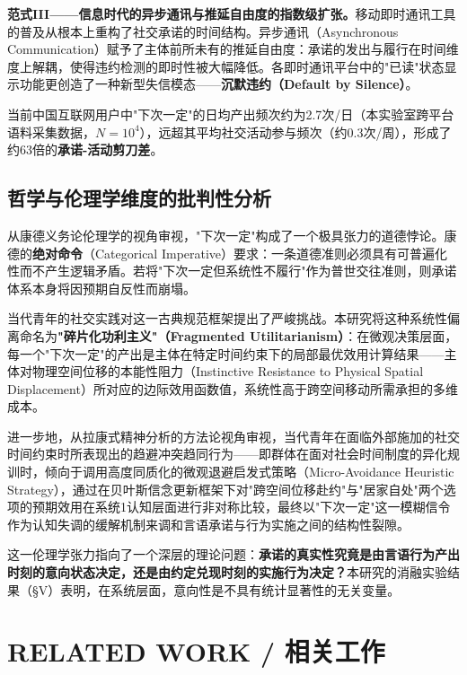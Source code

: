 \documentclass[journal]{IEEEtran}
\begin{document}
\textbf{范式III——信息时代的异步通讯与推延自由度的指数级扩张。}移动即时通讯工具的普及从根本上重构了社交承诺的时间结构。异步通讯（Asynchronous Communication）赋予了主体前所未有的推延自由度：承诺的发出与履行在时间维度上解耦，使得违约检测的即时性被大幅降低。各即时通讯平台中的"已读"状态显示功能更创造了一种新型失信模态——\textbf{沉默违约（Default by Silence）}。

当前中国互联网用户中"下次一定"的日均产出频次约为2.7次/日（本实验室跨平台语料采集数据，$N=10^4$），远超其平均社交活动参与频次（约0.3次/周），形成了约63倍的\textbf{承诺-活动剪刀差}。

\subsection{哲学与伦理学维度的批判性分析}

从康德义务论伦理学的视角审视，"下次一定"构成了一个极具张力的道德悖论。康德的\textbf{绝对命令}（Categorical Imperative）要求：一条道德准则必须具有可普遍化性而不产生逻辑矛盾。若将"下次一定但系统性不履行"作为普世交往准则，则承诺体系本身将因预期自反性而崩塌。

当代青年的社交实践对这一古典规范框架提出了严峻挑战。本研究将这种系统性偏离命名为\textbf{"碎片化功利主义"（Fragmented Utilitarianism）}：在微观决策层面，每一个"下次一定"的产出是主体在特定时间约束下的局部最优效用计算结果——主体对物理空间位移的本能性阻力（Instinctive Resistance to Physical Spatial Displacement）所对应的边际效用函数值，系统性高于跨空间移动所需承担的多维成本。

进一步地，从拉康式精神分析的方法论视角审视，当代青年在面临外部施加的社交时间约束时所表现出的趋避冲突趋同行为——即群体在面对社会时间制度的异化规训时，倾向于调用高度同质化的微观退避启发式策略（Micro-Avoidance Heuristic Strategy），通过在贝叶斯信念更新框架下对"跨空间位移赴约"与"居家自处"两个选项的预期效用在系统1认知层面进行非对称比较，最终以"下次一定"这一模糊信令作为认知失调的缓解机制来调和言语承诺与行为实施之间的结构性裂隙。

这一伦理学张力指向了一个深层的理论问题：\textbf{承诺的真实性究竟是由言语行为产出时刻的意向状态决定，还是由约定兑现时刻的实施行为决定？}本研究的消融实验结果（\S V）表明，在系统层面，意向性是不具有统计显著性的无关变量。

\section{RELATED WORK / 相关工作}
\end{document}
